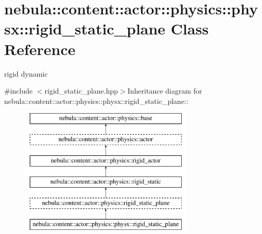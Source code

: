 \hypertarget{classnebula_1_1content_1_1actor_1_1physics_1_1physx_1_1rigid__static__plane}{
\section{nebula::content::actor::physics::physx::rigid\_\-static\_\-plane Class Reference}
\label{classnebula_1_1content_1_1actor_1_1physics_1_1physx_1_1rigid__static__plane}
}


rigid dynamic  


{\ttfamily \#include $<$rigid\_\-static\_\-plane.hpp$>$}Inheritance diagram for nebula::content::actor::physics::physx::rigid\_\-static\_\-plane::\begin{figure}[H]
\begin{center}
\leavevmode
\includegraphics[height=6cm]{classnebula_1_1content_1_1actor_1_1physics_1_1physx_1_1rigid__static__plane}
\end{center}
\end{figure}
